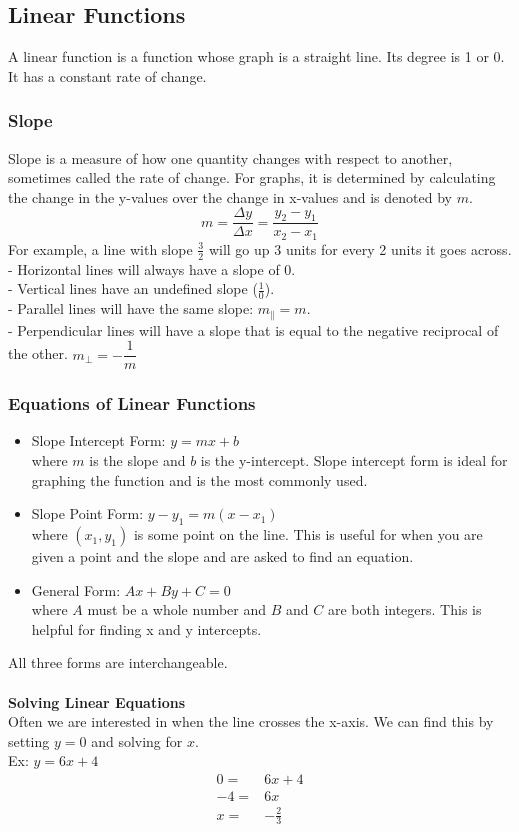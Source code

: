 \subsection{Linear Functions}
A linear function is a function whose graph is a straight line. Its degree is 1 or 0. It has a constant rate of change.

\subsubsection{Slope}
Slope is a measure of how one quantity changes with respect to another, sometimes called the rate of change. For graphs, it is determined by calculating the change in the y-values over the change in x-values and is denoted by $m$.
$$m=\frac{\Delta y}{\Delta x}=\frac{y_2-y_1}{x_2-x_1}$$
For example, a line with slope $\frac{3}{2}$ will go up 3 units for every 2 units it goes across.\\
- Horizontal lines will always have a slope of 0.\\
- Vertical lines have an undefined slope ($\frac{1}{0}$).\\
- Parallel lines will have the same slope: $m_\parallel=m$.\\
- Perpendicular lines will have a slope that is equal to the negative reciprocal of the other. ${m_\perp=-\dfrac{1}{m}}$

\subsubsection{Equations of Linear Functions}
\begin{itemize}
    \item Slope Intercept Form: $y=mx+b$\\
    where $m$ is the slope and $b$ is the y-intercept. Slope intercept form is ideal for graphing the function and is the most commonly used.
    \item Slope Point Form: $y-y_1=m(x-x_1)$\\
    where $(x_1,y_1)$ is some point on the line. This is useful for when you are given a point and the slope and are asked to find an equation.
    \item General Form: $Ax+By+C=0$\\
    where $A$ must be a whole number and $B$ and $C$ are both integers. This is helpful for finding x and y intercepts.
\end{itemize}
All three forms are interchangeable.\\
\\
\textbf{Solving Linear Equations}\\
Often we are interested in when the line crosses the x-axis. We can find this by setting $y=0$ and solving for $x$.\\
Ex: $y=6x+4$
\begin{align*}
    0=&6x+4\\
    -4=&6x\\
    x=&-\frac{2}{3}
\end{align*}


